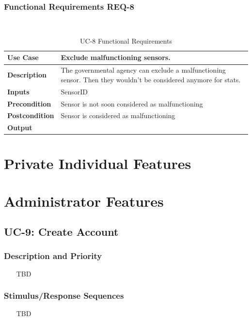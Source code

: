 \documentclass{report}
\begin{document}
\subsubsection*{Functional Requirements REQ-8} ~~~
\begin{table}[H]
	\begin{center}
		\begin{tabular}{|m{4cm}|m{10cm}|}
		\hline
		\textbf{Use Case} & Exclude malfunctioning sensors. \\
		\hline
		\textbf{Description} & The governmental agency can exclude a malfunctioning sensor. Then they wouldn't be considered anymore for stats. \\
		\hline
		\textbf{Inputs} & SensorID\\
		\hline
		\textbf{Precondition} & Sensor is not soon considered as malfunctioning \\
		\hline
		\textbf{Postcondition} &  Sensor is considered as malfunctioning\\
		\hline
		\textbf{Output} & \\
		\hline
		\end{tabular}
	\end{center}
	\caption{UC-8 Functional Requirements}
	\label{table:REQ-8}
\end{table}


\section{Private Individual Features}
\section{Administrator Features}

\subsection{UC-9: Create Account}

\subsubsection*{Description and Priority} ~~~
TBD

\subsubsection*{Stimulus/Response Sequences} ~~~
TBD
\end{document}
